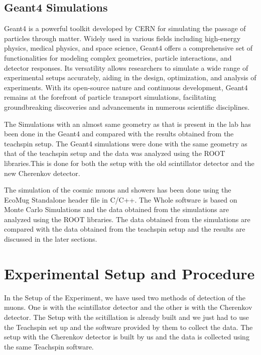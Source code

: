 \documentclass{article}
\begin{document}
\begin{multicols}{2}
\subsection{Geant4 Simulations}

Geant4 is a powerful toolkit developed by CERN for simulating the passage of particles through matter. Widely used in various fields including high-energy physics, medical physics, and space science, Geant4 offers a comprehensive set of functionalities for modeling complex geometries, particle interactions, and detector responses. Its versatility allows researchers to simulate a wide range of experimental setups accurately, aiding in the design, optimization, and analysis of experiments. With its open-source nature and continuous development, Geant4 remains at the forefront of particle transport simulations, facilitating groundbreaking discoveries and advancements in numerous scientific disciplines.

The Simulations with an almost same geometry as that is present in the lab has been done in the Geant4 and compared with the results obtained from the teachspin setup. The Geant4 simulations were done with the same geometry as that of the teachspin setup and the data was analyzed using the ROOT libraries.This is done for both the setup with the old scintillator detector and the new Cherenkov detector.

The simulation of the cosmic muons and showers has been done using the EcoMug Standalone header file in C/C++. The Whole software is based on Monte Carlo Simulations and the data obtained from the simulations are analyzed using the ROOT libraries. The data obtained from the simulations are compared with the data obtained from the teachspin setup and the results are discussed in the later sections.
\section{\label{expsetup}Experimental Setup and Procedure }

In the Setup of the Experiment, we have used two methods of detection of the muons. One is with the scintillator detector and the other is with the Cherenkov detector. The Setup with the scitillation is already built and we just had to use the Teachspin set up and the software provided by them to collect the data. The setup with the Cherenkov detector is built by us and the data is collected using the same Teachspin software.


\end{multicols}
\end{document}
